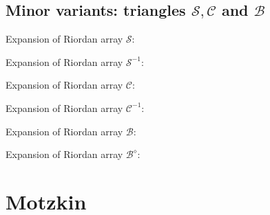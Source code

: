 \documentclass[11pt,a4paper]{article} %
\begin{document}
    \subsection{Minor variants: triangles $\mathcal{S}, \mathcal{C}$ and $\mathcal{B}$}

    Expansion of Riordan array $\mathcal{S}$:
    
    Expansion of Riordan array $\mathcal{S}^{-1}$:
    
    Expansion of Riordan array $\mathcal{C}$:
    
    Expansion of Riordan array $\mathcal{C}^{-1}$:
    
    Expansion of Riordan array $\mathcal{B}$:
    
    Expansion of Riordan array $\mathcal{B}^{\diamond}$:
    

    
    
    
    
    
    

    \section{Motzkin}
\end{document}
